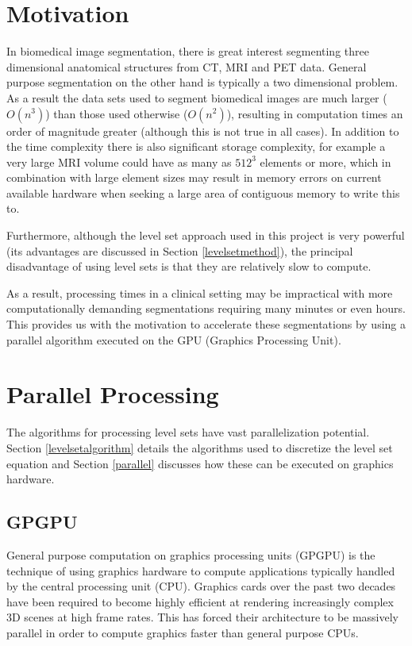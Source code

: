 \section{Motivation}
In biomedical image segmentation, there is great interest segmenting three dimensional anatomical structures from CT, MRI and PET data. General purpose segmentation on the other hand is typically a two dimensional problem. As a result the data sets used to segment biomedical images are much larger ($O(n^3)$) than those used otherwise ($O(n^2)$), resulting in computation times an order of magnitude greater (although this is not true in all cases). In addition to the time complexity there is also significant storage complexity, for example a very large MRI volume could have as many as $512^3$ elements or more, which in combination with large element sizes may result in memory errors on current available hardware when seeking a large area of contiguous memory to write this to. 

Furthermore, although the level set approach used in this project is very powerful (its advantages are discussed in Section \ref{levelsetmethod}), the principal disadvantage of using level sets is that they are relatively slow to compute.

As a result, processing times in a clinical setting may be impractical with more computationally demanding segmentations requiring many minutes or even hours. This provides us with the motivation to accelerate these segmentations by using a parallel algorithm executed on the GPU (Graphics Processing Unit).


\section{Parallel Processing}
The algorithms for processing level sets have vast parallelization potential. Section \ref{levelsetalgorithm} details the algorithms used to discretize the level set equation and Section \ref{parallel} discusses how these can be executed on graphics hardware.
	\subsection{GPGPU}
General purpose computation on graphics processing units (GPGPU) is the technique of using graphics hardware to compute applications typically handled by the central processing unit (CPU). Graphics cards over the past two decades have been required to become highly efficient at rendering increasingly complex 3D scenes at high frame rates. This has forced their architecture to be massively parallel in order to compute graphics faster than general purpose CPUs.

